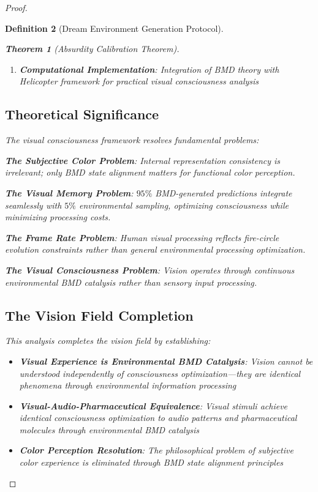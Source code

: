\documentclass[12pt,a4paper]{article}
\newtheorem{theorem}{Theorem}[section]
\newtheorem{definition}[theorem]{Definition}
\begin{document}
\begin{proof}
\begin{definition}[Dream Environment Generation Protocol]
\begin{theorem}[Absurdity Calibration Theorem]
\begin{enumerate}
\item \textbf{Computational Implementation}: Integration of BMD theory with Helicopter framework for practical visual consciousness analysis
\end{enumerate}

\subsection{Theoretical Significance}

The visual consciousness framework resolves fundamental problems:

\textbf{The Subjective Color Problem}: Internal representation consistency is irrelevant; only BMD state alignment matters for functional color perception.

\textbf{The Visual Memory Problem}: $95\%$ BMD-generated predictions integrate seamlessly with $5\%$ environmental sampling, optimizing consciousness while minimizing processing costs.

\textbf{The Frame Rate Problem}: Human visual processing reflects fire-circle evolution constraints rather than general environmental processing optimization.

\textbf{The Visual Consciousness Problem}: Vision operates through continuous environmental BMD catalysis rather than sensory input processing.

\subsection{The Vision Field Completion}

This analysis completes the vision field by establishing:

\begin{itemize}
\item \textbf{Visual Experience is Environmental BMD Catalysis}: Vision cannot be understood independently of consciousness optimization—they are identical phenomena through environmental information processing

\item \textbf{Visual-Audio-Pharmaceutical Equivalence}: Visual stimuli achieve identical consciousness optimization to audio patterns and pharmaceutical molecules through environmental BMD catalysis

\item \textbf{Color Perception Resolution}: The philosophical problem of subjective color experience is eliminated through BMD state alignment principles


\end{itemize}
\end{theorem}
\end{definition}
\end{proof}
\end{document}

